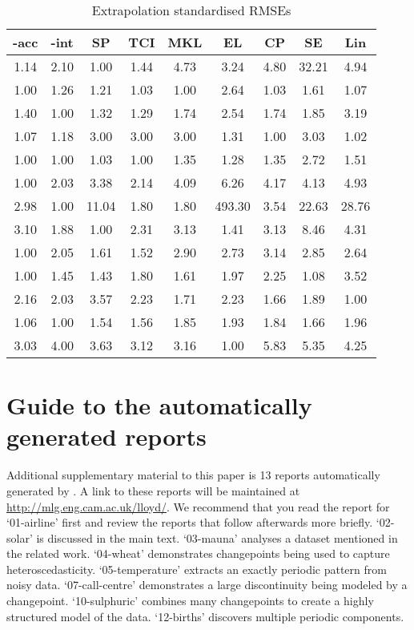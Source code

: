 \begin{table*}[ht]
\center
\begin{tabular}{|c|c|c|c|c|c|c|c|c|}
\hline
\procedurename{}-acc & \procedurename{}-int & SP & TCI & MKL & EL & CP & SE & Lin \\
\hline
1.14 & 2.10 & 1.00 & 1.44 & 4.73 & 3.24 & 4.80 & 32.21 & 4.94\\
1.00 & 1.26 & 1.21 & 1.03 & 1.00 & 2.64 & 1.03 & 1.61 & 1.07\\
1.40 & 1.00 & 1.32 & 1.29 & 1.74 & 2.54 & 1.74 & 1.85 & 3.19\\
1.07 & 1.18 & 3.00 & 3.00 & 3.00 & 1.31 & 1.00 & 3.03 & 1.02\\
1.00 & 1.00 & 1.03 & 1.00 & 1.35 & 1.28 & 1.35 & 2.72 & 1.51\\
1.00 & 2.03 & 3.38 & 2.14 & 4.09 & 6.26 & 4.17 & 4.13 & 4.93\\
2.98 & 1.00 & 11.04 & 1.80 & 1.80 & 493.30 & 3.54 & 22.63 & 28.76\\
3.10 & 1.88 & 1.00 & 2.31 & 3.13 & 1.41 & 3.13 & 8.46 & 4.31\\
1.00 & 2.05 & 1.61 & 1.52 & 2.90 & 2.73 & 3.14 & 2.85 & 2.64\\
1.00 & 1.45 & 1.43 & 1.80 & 1.61 & 1.97 & 2.25 & 1.08 & 3.52\\
2.16 & 2.03 & 3.57 & 2.23 & 1.71 & 2.23 & 1.66 & 1.89 & 1.00\\
1.06 & 1.00 & 1.54 & 1.56 & 1.85 & 1.93 & 1.84 & 1.66 & 1.96\\
3.03 & 4.00 & 3.63 & 3.12 & 3.16 & 1.00 & 5.83 & 5.35 & 4.25\\
\hline
\end{tabular}
\caption[Extrapolation error]{Extrapolation standardised RMSEs}
\label{table:extrap}
\end{table*}

\section{Guide to the automatically generated reports}

Additional supplementary material to this paper is 13 reports automatically generated by \procedurename{}.
A link to these reports will be maintained at \url{http://mlg.eng.cam.ac.uk/lloyd/}.
We recommend that you read the report for `01-airline' first and review the reports that follow afterwards more briefly.
`02-solar' is discussed in the main text.
`03-mauna' analyses a dataset mentioned in the related work.
`04-wheat' demonstrates changepoints being used to capture heteroscedasticity.
`05-temperature' extracts an exactly periodic pattern from noisy data.
`07-call-centre' demonstrates a large discontinuity being modeled by a changepoint.
`10-sulphuric' combines many changepoints to create a highly structured model of the data.
`12-births' discovers multiple periodic components.



